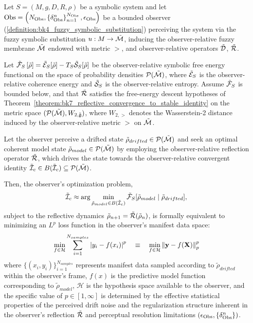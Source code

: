 \begin{theorem}
\label{theorem:bk7_observer_relative_free_energy_minimization_as_lp_regression}
Let $S = (M, g, D, R, \rho)$ be a symbolic system and let 
$\mathrm{Obs} = \left(N_{\mathrm{Obs}}, \left\{ \delta^{n}_{\mathrm{Obs}} \right\}_{n=1}^{N_{\mathrm{Obs}}}, \epsilon_{\mathrm{Obs}} \right)$ 
be a bounded observer (\ref{definition:bk4_fuzzy_symbolic_substitution}) perceiving the system via the fuzzy symbolic substitution 
$u : M \to \tilde{\mathcal{M}}$, inducing the observer-relative fuzzy membrane $\tilde{\mathcal{M}}$ endowed with metric $\gt$, and observer-relative operators $\tilde{\mathcal{D}}$, $\tilde{\mathcal{R}}$.

Let $\tilde{\mathcal{F}}_S\left[ \tilde{\rho} \right] = \tilde{\mathcal{E}}_S[\tilde{\rho}] - T_S \tilde{\mathcal{S}}_S[\tilde{\rho}]$ be the observer-relative symbolic free energy functional on the space of probability densities $\mathcal{P}(\tilde{\mathcal{M}})$, where $\tilde{\mathcal{E}}_S$ is the observer-relative coherence energy and $\tilde{\mathcal{S}}_S$ is the observer-relative entropy. Assume $\tilde{\mathcal{F}}_S$ is bounded below, and that $\tilde{\mathcal{R}}$ satisfies the free-energy descent hypotheses of Theorem~\ref{theorem:bk7_reflective_convergence_to_stable_identity} on the metric space $(\mathcal{P}(\tilde{\mathcal{M}}), W_{2,\tilde{\mathfrak{g}}})$, where $W_{2,\gt}$ denotes the Wasserstein-2 distance induced by the observer-relative metric $\gt$ on $\tilde{\mathcal{M}}$.

Let the observer perceive a drifted state $\tilde{\rho}_{drifted} \in \mathcal{P}(\tilde{\mathcal{M}})$ and seek an optimal coherent model state $\tilde{\rho}_{model} \in \mathcal{P}(\tilde{\mathcal{M}})$ by employing the observer-relative reflection operator $\tilde{\mathcal{R}}$, which drives the state towards the observer-relative convergent identity $\tilde{\mathcal{I}}_c \in B(\tilde{\mathcal{I}}_c) \subseteq \mathcal{P}(\tilde{\mathcal{M}})$.

Then, the observer's optimization problem,
\[
\tilde{\mathcal{I}}_c \approx \arg\min_{\tilde{\rho}_{model} \in B(\tilde{\mathcal{I}}_c)} \tilde{\mathcal{F}}_S[ \tilde{\rho}_{model} \mid \tilde{\rho}_{drifted} ],
\]
subject to the reflective dynamics $\tilde{\rho}_{n+1} = \tilde{\mathcal{R}}(\tilde{\rho}_n)$, is formally equivalent to minimizing an $L^p$ loss function in the observer's manifest data space:
\[
\min_{f \in \mathcal{H}} \sum_{i=1}^{N_{samples}} \left|y_i - f(x_i)\right|^p \quad \equiv \quad \min_{f \in \mathcal{H}} \left\|\mathbf{y} - f(\mathbf{X})\right\|_p^p
\]
where $\{(x_i, y_i)\}_{i=1}^{N_{samples}}$ represents manifest data sampled according to $\tilde{\rho}_{drifted}$ within the observer's frame, $f(x)$ is the predictive model function corresponding to $\tilde{\rho}_{model}$, $\mathcal{H}$ is the hypothesis space available to the observer, and the specific value of $p \in [1, \infty]$ is determined by the effective statistical properties of the perceived drift noise and the regularization structure inherent in the observer's reflection $\tilde{\mathcal{R}}$ and perceptual resolution limitations $(\epsilon_{\mathrm{Obs}}, \{\delta^n_{\mathrm{Obs}}\})$.


\end{theorem}
